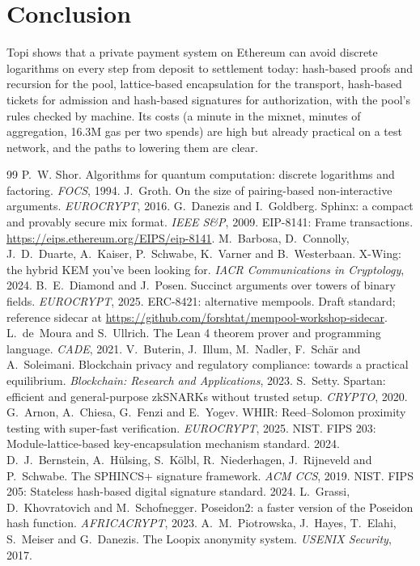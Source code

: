\documentclass[11pt,a4paper]{article}
\begin{document}
\section{Conclusion}

Topi shows that a private payment system on Ethereum can avoid discrete logarithms on every step from
deposit to settlement today: hash-based proofs and recursion for the pool, lattice-based encapsulation
for the transport, hash-based tickets for admission and hash-based signatures for authorization, with the
pool's rules checked by machine. Its costs (a minute in the mixnet, minutes of aggregation, 16.3M gas per
two spends) are high but already practical on a test network, and the paths to lowering them are clear.

\begin{thebibliography}{99}
\small
{} P.~W. Shor. Algorithms for quantum computation: discrete logarithms and factoring.
  \emph{FOCS}, 1994.
 J.~Groth. On the size of pairing-based non-interactive arguments. \emph{EUROCRYPT}, 2016.
 G.~Danezis and I.~Goldberg. Sphinx: a compact and provably secure mix format.
  \emph{IEEE S\&P}, 2009.
 EIP-8141: Frame transactions. \url{https://eips.ethereum.org/EIPS/eip-8141}.
 M.~Barbosa, D.~Connolly, J.~D.~Duarte, A.~Kaiser, P.~Schwabe, K.~Varner and B.~Westerbaan.
  X-Wing: the hybrid KEM you've been looking for. \emph{IACR Communications in Cryptology}, 2024.
 B.~E.~Diamond and J.~Posen. Succinct arguments over towers of binary fields.
  \emph{EUROCRYPT}, 2025.
 ERC-8421: alternative mempools. Draft standard; reference sidecar at
  \url{https://github.com/forshtat/mempool-workshop-sidecar}.
 L.~de~Moura and S.~Ullrich. The Lean 4 theorem prover and programming language.
  \emph{CADE}, 2021.
 V.~Buterin, J.~Illum, M.~Nadler, F.~Schär and A.~Soleimani. Blockchain privacy and
  regulatory compliance: towards a practical equilibrium. \emph{Blockchain: Research and Applications}, 2023.
 S.~Setty. Spartan: efficient and general-purpose zkSNARKs without trusted setup.
  \emph{CRYPTO}, 2020.
 G.~Arnon, A.~Chiesa, G.~Fenzi and E.~Yogev. WHIR: Reed--Solomon proximity testing with
  super-fast verification. \emph{EUROCRYPT}, 2025.
 NIST. FIPS 203: Module-lattice-based key-encapsulation mechanism standard. 2024.
 D.~J.~Bernstein, A.~Hülsing, S.~Kölbl, R.~Niederhagen, J.~Rijneveld and P.~Schwabe.
  The SPHINCS+ signature framework. \emph{ACM CCS}, 2019.
 NIST. FIPS 205: Stateless hash-based digital signature standard. 2024.
 L.~Grassi, D.~Khovratovich and M.~Schofnegger. Poseidon2: a faster version of the
  Poseidon hash function. \emph{AFRICACRYPT}, 2023.
 A.~M.~Piotrowska, J.~Hayes, T.~Elahi, S.~Meiser and G.~Danezis. The Loopix anonymity
  system. \emph{USENIX Security}, 2017.
\end{thebibliography}
\end{document}
